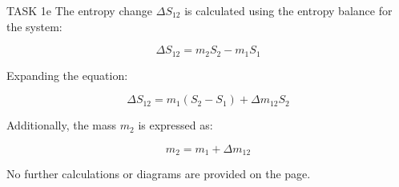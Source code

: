 TASK 1e  
The entropy change \( \Delta S_{12} \) is calculated using the entropy balance for the system:  

\[
\Delta S_{12} = m_2 S_2 - m_1 S_1
\]

Expanding the equation:  

\[
\Delta S_{12} = m_1 (S_2 - S_1) + \Delta m_{12} S_2
\]

Additionally, the mass \( m_2 \) is expressed as:  

\[
m_2 = m_1 + \Delta m_{12}
\]  

No further calculations or diagrams are provided on the page.